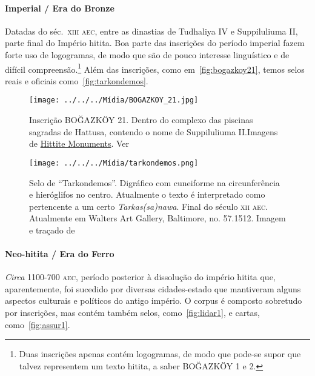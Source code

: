 \paragraph{Imperial \slash{} Era do Bronze} Datadas do séc.\ \textsc{xiii aec},
entre as dinastias de Tudhaliya IV e Suppiluliuma II, parte final do Império
hitita.
Boa parte das inscrições do período imperial fazem forte uso de logogramas,
de modo que são de pouco interesse linguístico e de difícil
compreensão.\footnote{Duas inscrições apenas contém logogramas, de modo que
	pode-se supor que talvez representem um texto hitita, a saber BOĞAZKÖY 1 e 2.}
Além das inscrições, como em~\autoref{fig:bogazkoy21},
temos selos reais e oficiais
como~\autoref{fig:tarkondemos}.

\begin{figure}[htb]
	\begin{center}
		\texttt{[image: ../../../Mídia/BOGAZKOY\_21.jpg]}
		\caption{Inscrição BOĞAZKÖY 21. Dentro do complexo das piscinas sagradas de
			Hattusa, contendo o nome de Suppiluliuma II.\@ Imagens de
			\href{https://www.hittitemonuments.com/bogazkoy/}{Hittite
				Monuments}. Ver~\citet[p. 48ff.]{CHLI3}
		}\label{fig:bogazkoy21}
	\end{center}
	\begin{center}
		\texttt{[image: ../../../Mídia/tarkondemos.png]}
	\end{center}
	\caption{Selo de ``Tarkondemos''. Digráfico com cuneiforme na circunferência e
		hieróglifos no centro. Atualmente o texto é interpretado como pertencente a
		um certo \emph{Tarkas{(sa)}nawa}. Final do século \textsc{xii aec}.
		Atualmente em Walters Art Gallery, Baltimore, no. 57.1512.
		Imagem e traçado de~\citet[p. 45f.; \emph{plate} 32]{CHLI3}
	}\label{fig:tarkondemos}
\end{figure}

\paragraph{Neo-hitita \slash{} Era do Ferro} \emph{Circa} 1100-700 \textsc{aec},
período posterior à dissolução do império hitita que, aparentemente, foi
sucedido por diversas cidades-estado que mantiveram alguns aspectos
culturais e políticos do antigo império.
O corpus é composto sobretudo por inscrições, mas contém também selos,
como~\autoref{fig:lidar1}, e cartas, como~\autoref{fig:assur1}.

